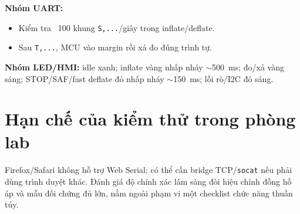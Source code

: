 \noindent\textbf{Nhóm UART:}
\begin{itemize}\itemsep0pt
	\item Kiểm tra ~100 khung \texttt{S,...}/giây trong inflate/deflate.
	\item Sau \texttt{T,...}, MCU vào margin rồi xả đo đúng trình tự.
\end{itemize}

\noindent\textbf{Nhóm LED/HMI:} idle xanh; inflate vàng nhấp nháy \(\sim\)500~ms; đo/xả vàng sáng; STOP/SAF/fast deflate đỏ nhấp nháy \(\sim\)150~ms; lỗi rò/I2C đỏ sáng.

\section{Hạn chế của kiểm thử trong phòng lab}
 Firefox/Safari không hỗ trợ Web Serial; có thể cần bridge TCP/\texttt{socat} nếu phải dùng trình duyệt khác. Đánh giá độ chính xác lâm sàng đòi hiệu chỉnh đồng hồ áp và mẫu đối chứng đủ lớn, nằm ngoài phạm vi một checklist chức năng thuần túy.
